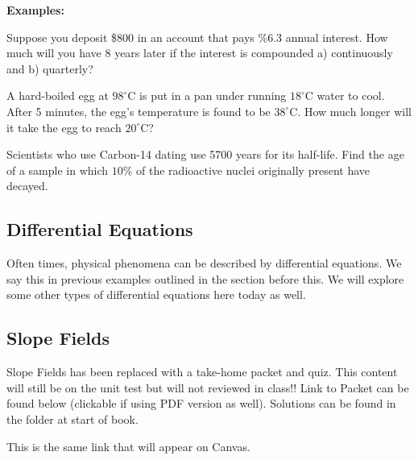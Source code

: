 \documentclass[addpoints, 12pt]{exam}
\begin{document}
\vspace{1in}

\textbf{Examples:}
\begin{questions}
    \question Suppose you deposit \$800 in an account that pays \%6.3 annual interest. How much will you have 8 years later if the interest is compounded a) continuously and b) quarterly?
    
    \question A hard-boiled egg at $98^\circ$C is put in a pan under running $18^\circ$C water to cool. After 5 minutes, the egg's temperature is found to be $38^\circ$C. How much longer will it take the egg to reach $20^\circ$C?
    
    \question Scientists who use Carbon-14 dating use 5700 years for its half-life. Find the age of a sample in which $10\%$ of the radioactive nuclei originally present have decayed.
\end{questions}

\newpage
{}
\subsection*{Differential Equations}
Often times, physical phenomena can be described by differential equations. We say this in previous examples outlined in the section before this. We will explore some other types of differential equations here today as well.

\vspace{.25in}

\subsection*{Slope Fields}


Slope Fields has been replaced with a take-home packet and quiz. This content will still be on the unit test but will not reviewed in class!! Link to Packet can be found below (clickable if using PDF version as well). Solutions can be found in the folder at start of book.

    \begin{center}
        
        
        \vspace{1cm}
        
        
        \vspace{1cm}
        This is the same link that will appear on Canvas.
        
        \vspace{.5cm}
    \end{center}
\end{document}
